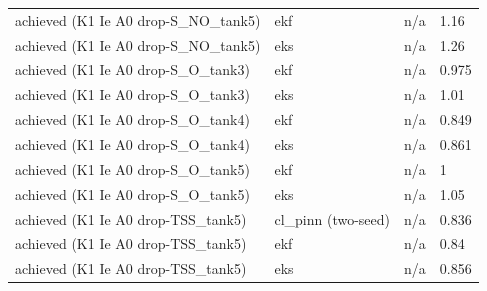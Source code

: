 \begin{table}[t]
\begin{tabular}{llll}
achieved (K1 Ie A0 drop-S\_NO\_tank5) & ekf & n/a & 1.16 \\
achieved (K1 Ie A0 drop-S\_NO\_tank5) & eks & n/a & 1.26 \\
achieved (K1 Ie A0 drop-S\_O\_tank3) & ekf & n/a & 0.975 \\
achieved (K1 Ie A0 drop-S\_O\_tank3) & eks & n/a & 1.01 \\
achieved (K1 Ie A0 drop-S\_O\_tank4) & ekf & n/a & 0.849 \\
achieved (K1 Ie A0 drop-S\_O\_tank4) & eks & n/a & 0.861 \\
achieved (K1 Ie A0 drop-S\_O\_tank5) & ekf & n/a & 1 \\
achieved (K1 Ie A0 drop-S\_O\_tank5) & eks & n/a & 1.05 \\
achieved (K1 Ie A0 drop-TSS\_tank5) & cl\_pinn (two-seed) & n/a & 0.836 \\
achieved (K1 Ie A0 drop-TSS\_tank5) & ekf & n/a & 0.84 \\
achieved (K1 Ie A0 drop-TSS\_tank5) & eks & n/a & 0.856 \\
\bottomrule
\end{tabular}
\end{table}
